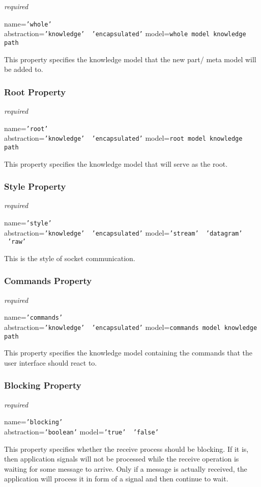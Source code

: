 \emph{required}

name=\texttt{'whole'}\\
abstraction=\texttt{'knowledge' \vline\ 'encapsulated'}
model=\texttt{whole model knowledge path}

This property specifies the knowledge model that the new part/ meta model will
be added to.

\subsubsection{Root Property}

\emph{required}

name=\texttt{'root'}\\
abstraction=\texttt{'knowledge' \vline\ 'encapsulated'}
model=\texttt{root model knowledge path}

This property specifies the knowledge model that will serve as the root.

\subsubsection{Style Property}

\emph{required}

name=\texttt{'style'}\\
abstraction=\texttt{'knowledge' \vline\ 'encapsulated'}
model=\texttt{'stream' \vline\ 'datagram' \vline\ 'raw'}

This is the style of socket communication.

\subsubsection{Commands Property}

\emph{required}

name=\texttt{'commands'}\\
abstraction=\texttt{'knowledge' \vline\ 'encapsulated'}
model=\texttt{commands model knowledge path}

This property specifies the knowledge model containing the commands that the
user interface should react to.

\subsubsection{Blocking Property}

\emph{required}

name=\texttt{'blocking'}\\
abstraction=\texttt{'boolean'}
model=\texttt{'true' \vline\ 'false'}

This property specifies whether the receive process should be blocking. If it
is, then application signals will not be processed while the receive operation
is waiting for some message to arrive. Only if a message is actually received,
the application will process it in form of a signal and then continue to wait.
